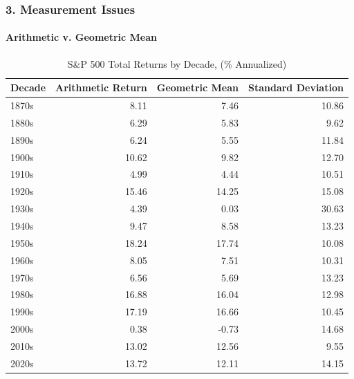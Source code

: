 \documentclass{beamer}
\begin{document}
\begin{frame}[t]
    \frametitle{3. Measurement Issues}
    \framesubtitle{Arithmetic v. Geometric Mean}
    
    \vspace{-1em}
    \scriptsize
    \begin{table}
    \caption{S\&P 500 Total Returns by Decade, (\% Annualized)}
    \begin{tabular}{lrrr}
    \toprule
    Decade & Arithmetic Return & Geometric Mean & Standard Deviation \\
    \midrule
    1870s & 8.11 & 7.46 & 10.86 \\
    1880s & 6.29 & 5.83 & 9.62 \\
    1890s & 6.24 & 5.55 & 11.84 \\
    1900s & 10.62 & 9.82 & 12.70 \\
    1910s & 4.99 & 4.44 & 10.51 \\
    1920s & 15.46 & 14.25 & 15.08 \\
    1930s & 4.39 & 0.03 & 30.63 \\
    1940s & 9.47 & 8.58 & 13.23 \\
    1950s & 18.24 & 17.74 & 10.08 \\
    1960s & 8.05 & 7.51 & 10.31 \\
    1970s & 6.56 & 5.69 & 13.23 \\
    1980s & 16.88 & 16.04 & 12.98 \\
    1990s & 17.19 & 16.66 & 10.45 \\
    2000s & 0.38 & -0.73 & 14.68 \\
    2010s & 13.02 & 12.56 & 9.55 \\
    2020s & 13.72 & 12.11 & 14.15 \\
    \bottomrule
    \end{tabular}
    \end{table}


\end{frame}
\end{document}
